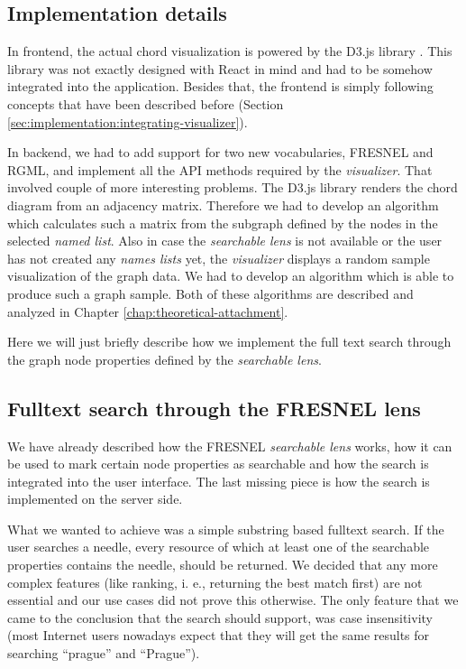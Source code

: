 \subsection{Implementation details}

In frontend, the actual chord visualization is powered by the D3.js library \cite{d3js}. This library was not exactly designed with React in mind and had to be somehow integrated into the application. Besides that, the frontend is simply following concepts that have been described before (Section \ref{sec:implementation:integrating-visualizer}).

In backend, we had to add support for two new vocabularies, FRESNEL and RGML, and implement all the API methods required by the \emph{visualizer}. That involved couple of more interesting problems. The D3.js library renders the chord diagram from an adjacency matrix. Therefore we had to develop an algorithm which calculates such a matrix from the subgraph defined by the nodes in the selected \emph{named list}. Also in case the \emph{searchable lens} is not available or the user has not created any \emph{names lists} yet, the \emph{visualizer} displays a random sample visualization of the graph data. We had to develop an algorithm which is able to produce such a graph sample. Both of these algorithms are described and analyzed in Chapter \ref{chap:theoretical-attachment}.

Here we will just briefly describe how we implement the full text search through the graph node properties defined by the \emph{searchable lens}.

\subsection{Fulltext search through the FRESNEL lens}
\label{sec:visualizers:chord:search}

We have already described how the FRESNEL \emph{searchable lens} works, how it can be used to mark certain node properties as searchable and how the search is integrated into the user interface. The last missing piece is how the search is implemented on the server side.

What we wanted to achieve was a simple substring based fulltext search. If the user searches a needle, every resource of which at least one of the searchable properties contains the needle, should be returned. We decided that any more complex features (like ranking, i. e., returning the best match first) are not essential and our use cases did not prove this otherwise. The only feature that we came to the conclusion that the search should support, was case insensitivity (most Internet users nowadays expect that they will get the same results for searching “prague” and “Prague”).

